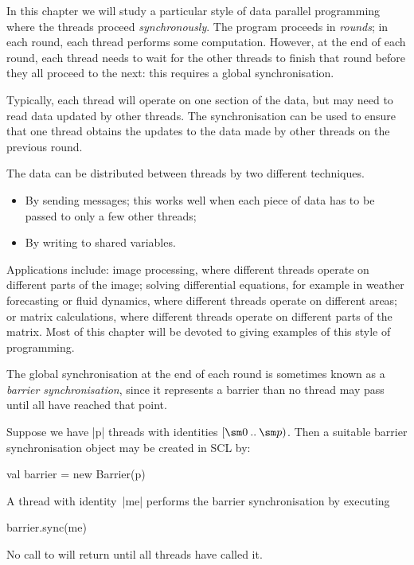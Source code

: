 In this chapter we will study a particular style of data parallel programming
where the threads proceed \emph{synchronously}.  The program proceeds in
\emph{rounds}; in each round, each thread performs some
computation.  However, at the end of each round, each thread needs to wait for
the other threads to finish that round before they all proceed to the next:
this requires a global synchronisation.


Typically, each thread will operate on one section of the data, but  may
need to read data updated by other threads.  The synchronisation can be used
to ensure that one thread obtains the updates to the data made by other
threads on the previous round.

The data can be distributed between threads by two different techniques.
%
\begin{itemize}
\item
By sending messages; this works well when each piece of data has to be
passed to only a few other threads;

\item
By writing to shared variables.
\end{itemize}



Applications include: image processing, where different threads operate on
different parts of the image; solving differential equations, for example in
weather forecasting or fluid dynamics, where different threads operate on
different areas; or matrix calculations, where different threads operate on
different parts of the matrix.  Most of this chapter will be devoted to giving
examples of this style of programming. 


The global synchronisation at the end of each round is sometimes known as a
\emph{barrier synchronisation}, since it
represents a barrier than no thread 
may pass until all have reached that point.

Suppose we have |p| threads with identities $\interval{\sm 0}{\sm p}$.  Then a
suitable barrier synchronisation object may be created in SCL
by: 
%
\begin{scala}
  val barrier = new Barrier(p)
\end{scala}
%
A thread with identity~|me| performs the barrier synchronisation by
executing%
%
\begin{scala}
  barrier.sync(me)
\end{scala}
%
No call to  will return until all  threads have called
it. 

